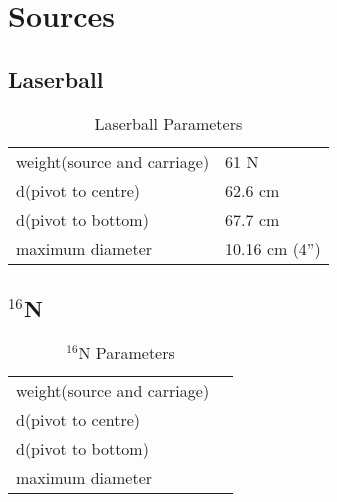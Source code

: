   
  
\chapter{Sources}
  
  
\section{Laserball}
  
\begin{table}[htb]
\begin{center}
\begin{tabular}{|l|l|}
\hline
weight(source and carriage) & 61 N  \\
d(pivot to centre)          & 62.6 cm  \\
d(pivot to bottom)          & 67.7 cm \\
maximum diameter            & 10.16 cm (4'')\\
\hline
\end{tabular}
\caption[Laserball Parameters]
        {Laserball Parameters
        }
\end{center}
\end{table}
  
  
  
\section{$^{16}$N}
  
\begin{table}[htb]
\begin{center}
\begin{tabular}{|l|l|}
\hline
weight(source and carriage) & \\
d(pivot to centre)          &  \\
d(pivot to bottom)          &   \\
maximum diameter            &  \\
\hline
\end{tabular}
\caption[$^{16}$N Parameters]
        {$^{16}$N Parameters
        }
\end{center}
\end{table}
  
